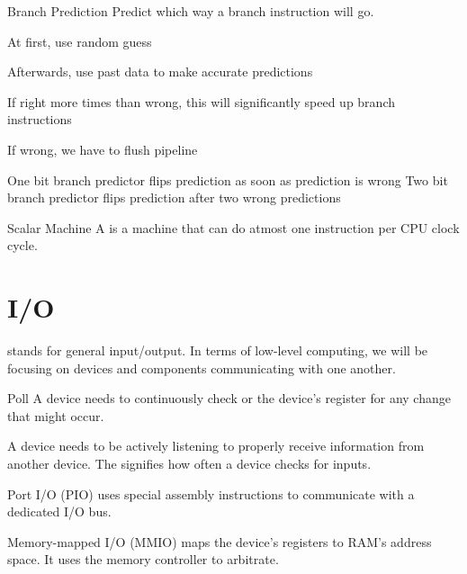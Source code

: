 \documentclass[12pt]{report}
\begin{document}
\begin{dfnbox}{Branch Prediction}
	Predict which way a branch instruction will go.
	\begin{dfnitems}
		\item At first, use random guess
		\item Afterwards, use past data to make accurate predictions
		\item If right more times than wrong, this will significantly speed up branch instructions
		\item If wrong, we have to flush pipeline
	\end{dfnitems}

	One bit branch predictor flips prediction as soon as prediction is wrong
	Two bit branch predictor flips prediction after two wrong predictions
\end{dfnbox}

\begin{dfnbox}{Scalar Machine}
	A  is a machine that can do atmost one instruction per CPU clock cycle.
\end{dfnbox}

\chapter{I/O}

 stands for general input/output. In terms of low-level computing, we will be focusing on devices and components communicating with one another.

\begin{dfnbox}{Poll}
	A device needs to continuously check or  the device's register for any change that might occur.
\end{dfnbox}

A device needs to be actively listening to properly receive information from another device. The  signifies how often a device checks for inputs.

\begin{dfnbox}{Port I/O (PIO)}
	 uses special assembly instructions to communicate with a dedicated I/O bus.
\end{dfnbox}

\begin{dfnbox}{Memory-mapped I/O (MMIO)}
	 maps the device's registers to RAM's address space. It uses the memory controller to arbitrate.
\end{dfnbox}
\end{document}
